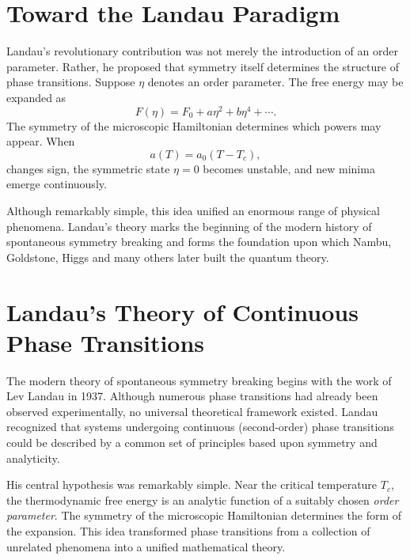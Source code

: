\section{Toward the Landau Paradigm}
Landau's revolutionary contribution was not merely the introduction of an
order parameter.
Rather,
he proposed that symmetry itself determines the structure of phase
transitions.
Suppose $\eta$ denotes an order parameter.
The free energy may be expanded as
\[F(\eta)=F_0+a\eta^2+b\eta^4+\cdots.\]
The symmetry of the microscopic Hamiltonian determines which powers may
appear.
When
\[a(T)=a_0(T-T_c),\]
changes sign,
the symmetric state $\eta=0$ becomes unstable,
and new minima emerge continuously.

Although remarkably simple,
this idea unified an enormous range of physical phenomena.
Landau's theory marks the beginning of the modern history of spontaneous
symmetry breaking and forms the foundation upon which Nambu, Goldstone,
Higgs and many others later built the quantum theory.

\section{Landau's Theory of Continuous Phase Transitions}
\label{sec:Landau}
The modern theory of spontaneous symmetry breaking begins with the work
of Lev  Landau in 1937. Although numerous phase transitions
had already been observed experimentally, no universal theoretical
framework existed. Landau recognized that systems undergoing continuous
(second-order) phase transitions could be described by a common set of
principles based upon symmetry and analyticity.

His central hypothesis was remarkably simple.
Near the critical temperature $T_c$, the thermodynamic free energy is an
analytic function of a suitably chosen \emph{order parameter}. The
symmetry of the microscopic Hamiltonian determines the form of the
expansion.
This idea transformed phase transitions from a collection of unrelated
phenomena into a unified mathematical theory.

